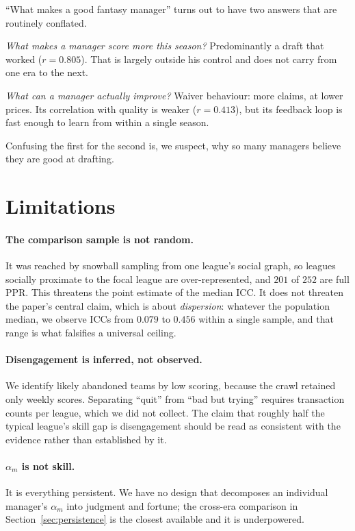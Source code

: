\documentclass[11pt]{article}
\begin{document}
``What makes a good fantasy manager'' turns out to have two answers that are
routinely conflated.

\emph{What makes a manager score more this season?} Predominantly a draft that
worked ($r = 0.805$). That is largely outside his control and does not carry from
one era to the next.

\emph{What can a manager actually improve?} Waiver behaviour: more claims, at
lower prices. Its correlation with quality is weaker ($r = 0.413$), but its
feedback loop is fast enough to learn from within a single season.

Confusing the first for the second is, we suspect, why so many managers believe
they are good at drafting.

\section{Limitations}\label{sec:limits}

\paragraph{The comparison sample is not random.} It was reached by snowball
sampling from one league's social graph, so leagues socially proximate to the
focal league are over-represented, and $201$ of $252$ are full PPR. This
threatens the point estimate of the median ICC. It does not threaten the paper's
central claim, which is about \emph{dispersion}: whatever the population median,
we observe ICCs from $0.079$ to $0.456$ within a single sample, and that range
is what falsifies a universal ceiling.

\paragraph{Disengagement is inferred, not observed.} We identify likely
abandoned teams by low scoring, because the crawl retained only weekly scores.
Separating ``quit'' from ``bad but trying'' requires transaction counts per
league, which we did not collect. The claim that roughly half the typical
league's skill gap is disengagement should be read as consistent with the
evidence rather than established by it.

\paragraph{$\alpha_m$ is not skill.} It is everything persistent. We have no
design that decomposes an individual manager's $\alpha_m$ into judgment and
fortune; the cross-era comparison in Section~\ref{sec:persistence} is the closest
available and it is underpowered.
\end{document}
